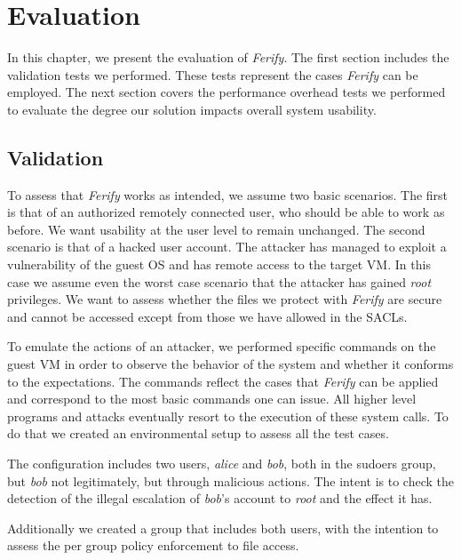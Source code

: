 \acresetall
\chapter{Evaluation}\label{ch:chapter4}

In this chapter, we present the evaluation of \emph{Ferify}. The first section includes the validation tests we performed. These tests represent the cases \emph{Ferify} can be employed. The next section covers the performance overhead tests we performed to evaluate the degree our solution impacts overall system usability.

\section{Validation}\label{sec:validation}

\par To assess that \emph{Ferify} works as intended, we assume two basic scenarios. The first is that of an authorized remotely connected user, who should be able to work as before. We want usability at the user level to remain unchanged. The second scenario is that of a hacked user account. The attacker has managed to exploit a vulnerability of the guest \ac{OS} and has remote access to the target \ac{VM}. In this case we assume even the worst case scenario that the attacker has gained \emph{root} privileges. We want to assess whether the files we protect with \emph{Ferify} are secure and cannot be accessed except from those we have allowed in the \acp{SACL}.

\par To emulate the actions of an attacker, we performed specific commands on the guest \ac{VM} in order to observe the behavior of the system and whether it conforms to the expectations. The commands reflect the cases that \emph{Ferify} can be applied and correspond to the most basic commands one can issue. All higher level programs and attacks eventually resort to the execution of these system calls. To do that we created an environmental setup to assess all the test cases. 

\par The configuration includes two users, \emph{alice} and \emph{bob}, both in the sudoers group, but \emph{bob} not legitimately, but through malicious actions. The intent is to check the detection of the illegal escalation of \emph{bob}'s account to \emph{root} and the effect it has.

\par Additionally we created a group that includes both users, with the intention to assess the per group policy enforcement to file access. 

